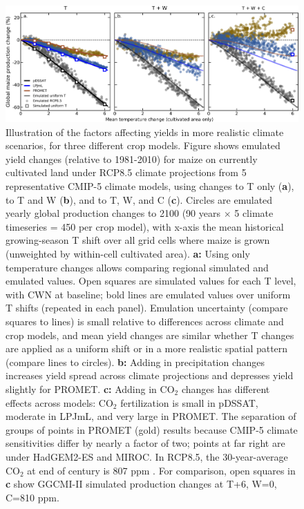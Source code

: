 \documentclass[gmd, manuscript]{copernicus} %
\begin{document}
\begin{figure}[ht]
    \centering
    \includegraphics[width = 16.3cm]{figures/global_em_maize.png}
    \caption{
    Illustration of the factors affecting yields in more realistic climate scenarios, for three different crop models. 
	Figure shows emulated yield changes (relative to 1981-2010) for maize on currently cultivated land under RCP8.5 climate projections from 5 representative CMIP-5 climate models, using changes to T only (\textbf{a}), to T and W (\textbf{b}), and to T, W, and C (\textbf{c}). 
    Circles are emulated yearly global production changes to 2100 (90 years $\times$ 5 climate timeseries = 450 per crop model), with x-axis the mean historical growing-season T shift over all grid cells where maize is grown (unweighted by within-cell cultivated area).
	\textbf{a:} Using only temperature changes allows comparing regional simulated and emulated values. Open squares are simulated values for each T level, with CWN at baseline; bold lines are emulated values over uniform T shifts (repeated in each panel). Emulation uncertainty (compare squares to lines) is small relative to differences across climate and crop models, and 
    mean yield changes are similar whether T changes are applied as a uniform shift or in a more realistic spatial pattern (compare lines to circles). 
    \textbf{b:} Adding in precipitation changes increases yield spread across climate projections and depresses yield slightly for PROMET. 
    \textbf{c:} Adding in CO$_2$ changes has different effects across models: 
	CO$_2$ fertilization is small in pDSSAT, moderate in LPJmL, and very large in PROMET. 
	The separation of groups of points in PROMET (gold) results because CMIP-5 climate sensitivities differ by nearly a factor of two; points at far right are under HadGEM2-ES and MIROC.
	In RCP8.5, the 30-year-average CO$_2$ at end of century is 807 ppm \citep{riahi2011rcp}. 
    For comparison, open squares in \textbf{c} show GGCMI-II simulated production changes at T+6, W=0, C=810 ppm.
    }
    \label{fig:globe_em}
\end{figure}
\end{document}
